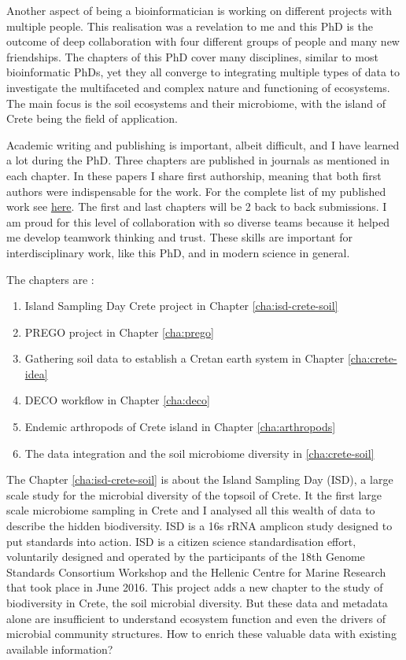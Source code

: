 \documentclass[
11pt, %
english, %
singlespacing, %
liststotoc, %
toctotoc, %
headsepline, %
]{MastersDoctoralThesis} %
\begin{document}
Another aspect of being a bioinformatician is working on different projects with 
multiple people. This realisation was a revelation to me and this PhD is the outcome 
of deep collaboration with four different groups of people and many new friendships. 
The chapters of this PhD cover many disciplines, similar to most bioinformatic PhDs,
yet they all converge to integrating multiple types of data to investigate the multifaceted
and complex nature and functioning of ecosystems. The main focus is the soil ecosystems and 
their microbiome, with the island of Crete being the field of application.

Academic writing and publishing is important, albeit difficult, and I have learned a
lot during the PhD. Three chapters are published in journals as
mentioned in each chapter. In these papers I share first authorship, meaning that 
both first authors were indispensable for the work. For the complete list of my published work see \hyperref[cv:my_refs]{here}.
The first and last chapters will be 2 back to back submissions. I am proud for this level of collaboration
with so diverse teams because it helped me develop teamwork thinking and trust. These skills are important 
for interdisciplinary work, like this PhD, and in modern science in general.

The chapters are :

\begin{enumerate}
    \item Island Sampling Day Crete project in Chapter \ref{cha:isd-crete-soil}
    \item PREGO project in Chapter \ref{cha:prego}
    \item Gathering soil data to establish a Cretan earth system in Chapter \ref{cha:crete-idea}
    \item DECO workflow in Chapter \ref{cha:deco}
    \item Endemic arthropods of Crete island in Chapter \ref{cha:arthropods}
    \item The data integration and the soil microbiome diversity in \ref{cha:crete-soil}
\end{enumerate}

The Chapter \ref{cha:isd-crete-soil} is about the Island Sampling Day (ISD), a large scale study for the microbial diversity of the
topsoil of Crete. It the first large scale microbiome sampling in Crete and I analysed
all this wealth of data to describe the hidden biodiversity. ISD is a 16s rRNA amplicon study designed to put standards into action. 
ISD is a citizen science standardisation effort, voluntarily designed and
operated by the participants of the 18th Genome Standards Consortium
Workshop and the Hellenic Centre for Marine Research that took place in June 2016.
This project adds a new chapter to the study of biodiversity in Crete,
the soil microbial diversity. But these data and metadata alone are 
insufficient to understand ecosystem function and even the drivers 
of microbial community structures. How to enrich these valuable data 
with existing available information? 
\end{document}
